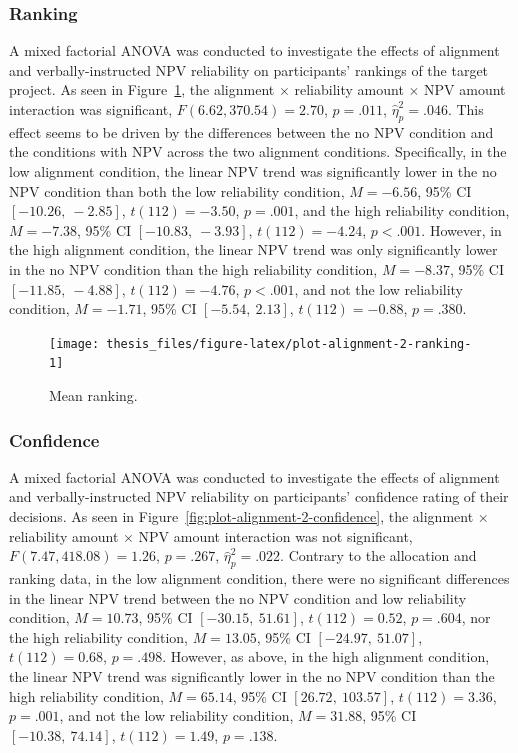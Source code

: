 \documentclass[a4paper, nobind, dvipsnames]{templates/ociamthesis}
\theoremstyle{definition}
\theoremstyle{definition}
\theoremstyle{definition}
\theoremstyle{definition}
\theoremstyle{remark}
\begin{document}
\subsubsection{Ranking}

A mixed factorial ANOVA was conducted to investigate the effects of alignment
and verbally-instructed NPV reliability on participants' rankings of the
target project. As seen in Figure~\ref{fig:plot-alignment-2-ranking}, the
alignment \(\times\) reliability amount \(\times\) NPV amount interaction was
significant,
\(F(6.62, 370.54) = 2.70\), \(p = .011\), \(\hat{\eta}^2_p = .046\). This
effect seems to be driven by the differences between the no NPV condition and
the conditions with NPV across the two alignment conditions. Specifically, in
the low alignment condition, the linear NPV trend was significantly lower in the
no NPV condition than both the low reliability condition,
\(M = -6.56\), 95\% CI \([-10.26,~-2.85]\), \(t(112) = -3.50\), \(p = .001\), and the high
reliability condition, \(M = -7.38\), 95\% CI \([-10.83,~-3.93]\), \(t(112) = -4.24\), \(p < .001\).
However, in the high alignment condition, the linear NPV trend was only
significantly lower in the no NPV condition than the high reliability condition,
\(M = -8.37\), 95\% CI \([-11.85,~-4.88]\), \(t(112) = -4.76\), \(p < .001\), and not the low
reliability condition, \(M = -1.71\), 95\% CI \([-5.54,~2.13]\), \(t(112) = -0.88\), \(p = .380\).



\begin{figure}
\texttt{[image: thesis\_files/figure-latex/plot-alignment-2-ranking-1]} \caption{Mean ranking.}\label{fig:plot-alignment-2-ranking}
\end{figure}

\subsubsection{Confidence}

A mixed factorial ANOVA was conducted to investigate the effects of alignment
and verbally-instructed NPV reliability on participants' confidence rating of
their decisions. As seen in Figure~\ref{fig:plot-alignment-2-confidence}, the
alignment \(\times\) reliability amount \(\times\) NPV amount interaction was not
significant,
\(F(7.47, 418.08) = 1.26\), \(p = .267\), \(\hat{\eta}^2_p = .022\).
Contrary to the allocation and ranking data, in
the low alignment condition, there were no significant differences in the linear
NPV trend between the no NPV condition and low reliability condition,
\(M = 10.73\), 95\% CI \([-30.15,~51.61]\), \(t(112) = 0.52\), \(p = .604\), nor the high
reliability condition, \(M = 13.05\), 95\% CI \([-24.97,~51.07]\), \(t(112) = 0.68\), \(p = .498\).
However, as above, in the high alignment condition, the linear NPV trend was
significantly lower in the no NPV condition than the high reliability condition,
\(M = 65.14\), 95\% CI \([26.72,~103.57]\), \(t(112) = 3.36\), \(p = .001\), and not the low
reliability condition, \(M = 31.88\), 95\% CI \([-10.38,~74.14]\), \(t(112) = 1.49\), \(p = .138\).
\end{document}
